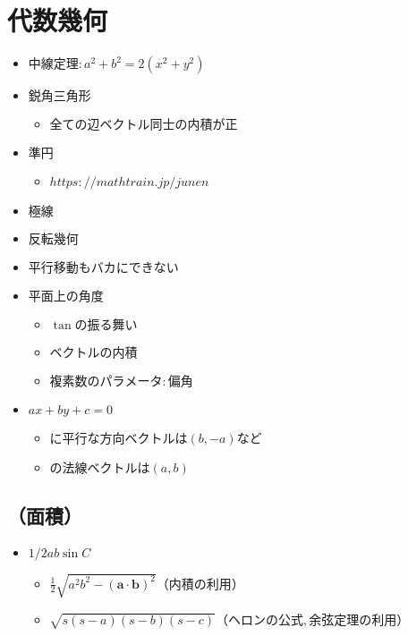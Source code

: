 \documentclass[dvipdfmx,uplatex]{jsarticle}
\begin{document}
\section{代数幾何}
\begin{itemize}
	\item $ 中線定理: a^2+b^2 = 2(x^2+y^2)$
	\item $ 鋭角三角形$
	\begin{itemize}
		\item $ 全ての辺ベクトル同士の内積が正$
	\end{itemize}
	\item $ 準円$
	\begin{itemize}
		\item $ https://mathtrain.jp/junen$
	\end{itemize}
	\item $ 極線$
	\item $ 反転幾何$
	\item $ 平行移動もバカにできない$
	\item $ 平面上の角度$
	\begin{itemize}
		\item $ \tan の振る舞い$
		\item $ ベクトルの内積$
		\item $ 複素数のパラメータ:偏角$
	\end{itemize}
	\item $ ax+by+c=0$
	\begin{itemize}
		\item $ に平行な方向ベクトルは(b,-a)など$
		\item $ の法線ベクトルは(a,b)$
	\end{itemize}
\end{itemize}
\subsection{（面積）}
\begin{itemize}
	\item $ 1/2ab \sin C$
	\begin{itemize}
		\item $ \frac{1}{2} \sqrt{a^2b^2 - (\bm{a} \cdot \bm{b})^2} （内積の利用）$
		\item $ \sqrt{s(s-a)(s-b)(s-c)} （ヘロンの公式,余弦定理の利用）$
	\end{itemize}
\end{itemize}
\end{document}

